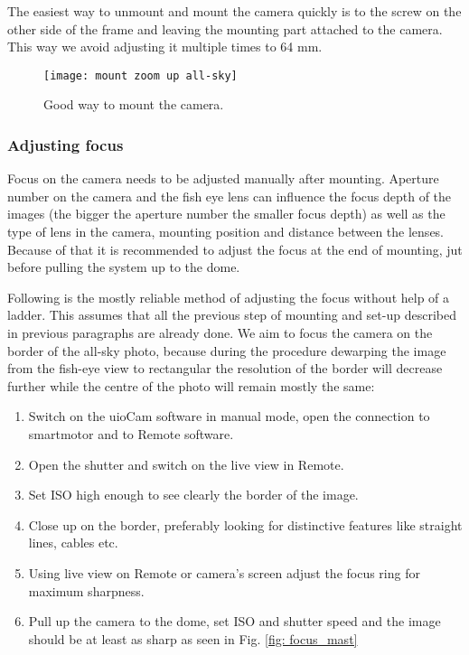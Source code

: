 \documentclass[]{book}
\begin{document}
	The easiest way to unmount and mount the camera quickly is to the screw on the other side of the frame and leaving the mounting part attached to the camera. This way we avoid adjusting it multiple times to 64 mm.
		
		\begin{figure}
			\centering
			\texttt{[image: mount zoom up all-sky]}
			\caption{Good way to mount the camera.} \label{fig: mount zoom up}
		\end{figure}
	
	\subsubsection{Adjusting focus} \label{sec: adjusting focus}
	Focus on the camera needs to be adjusted manually after mounting. Aperture number on the camera and the fish eye lens can influence the focus depth of the images (the bigger the aperture number the smaller focus depth) as well as the type of lens in the camera, mounting position and distance between the lenses. Because of that it is recommended to adjust the focus at the end of mounting, jut before pulling the system up to the dome.
	
	Following is the mostly reliable method of adjusting the focus without help of a ladder. This assumes that all the previous step of mounting and set-up described in previous paragraphs are already done. We aim to focus the camera on the border of the all-sky photo, because during the procedure dewarping the image from the fish-eye view to rectangular the resolution of the border will decrease further while the centre of the photo will remain mostly the same:
	
	\begin{enumerate}
		\item Switch on the uioCam software in manual mode, open the connection to smartmotor and to Remote software.
		\item Open the shutter and switch on the live view in Remote.
		\item Set ISO high enough to see clearly the border of the image.
		\item Close up on the border, preferably looking for distinctive features like straight lines, cables etc.
		\item Using live view on Remote or camera's screen adjust the focus ring for maximum sharpness.
		\item Pull up the camera to the dome, set ISO and shutter speed and the image should be at least as sharp as seen in Fig. \ref{fig: focus_mast} 
	\end{enumerate}
	
\end{document}
